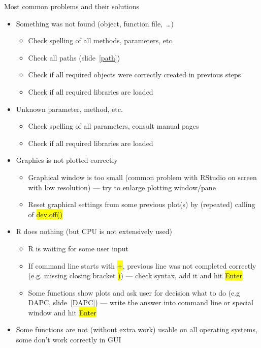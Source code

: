 \documentclass[compress, ucs, xelatex, 11pt, xcolor=svgnames,
	hyperref={
		bookmarks=true,
		unicode=true,
		colorlinks=true,
		pdftitle={Molecular data in R},
		plainpages=false,
		pdfauthor={Vojtech Zeisek},
		pdfsubject={Course about phylogeny and evolution in R},
		pdfcreator={XeLaTeX},
		pdfkeywords={R, evolution, phylogeny, molecular data},
		linkcolor=Tomato,
		anchorcolor=SaddleBrown,
		citecolor=Goldenrod,
		filecolor=DarkMagenta,
		menucolor=Sienna,
		urlcolor=DarkTurquoise,
		pdftex},
	url={hyphens, lowtilde} %
	]{beamer}
\renewcommand{\texttt}[1]{\hl{\ttfamily #1}}
\begin{document}
\begin{frame}[allowframebreaks]{Most common problems and their solutions}
	\label{problems}
	\begin{itemize}
		\item Something was not found (object, function file,~\ldots)
		\begin{itemize}
			\item Check spelling of all methods, parameters, etc.
			\item Check all paths (slide~\ref{path})
			\item Check if all required objects were correctly created in previous steps
			\item Check if all required libraries are loaded
		\end{itemize}
		\item Unknown parameter, method, etc.
		\begin{itemize}
			\item Check spelling of all parameters, consult manual pages
			\item Check if all required libraries are loaded
		\end{itemize}
		\item Graphics is not plotted correctly
		\begin{itemize}
			\item Graphical window is too small (common problem with RStudio on screen with low resolution) --- try to enlarge plotting window/pane
			\item Reset graphical settings from some previous plot(s) by (repeated) calling of \texttt{dev.off()}
		\end{itemize}
		\item R does nothing (but CPU is not extensively used)
		\begin{itemize}
			\item R is waiting for some user input
			\item If command line starts with \texttt{+}, previous line was not completed correctly (e.g. missing closing bracket \texttt{)}) --- check syntax, add it and hit \texttt{Enter}
			\item Some functions show plots and ask user for decision what to do (e.g DAPC, slide~\ref{DAPC}) --- write the answer into command line or special window and hit \texttt{Enter}
		\end{itemize}
		\item Some functions are not (without extra work) usable on all operating systems, some don't work correctly in GUI

\end{itemize}
\end{frame}
\end{document}
